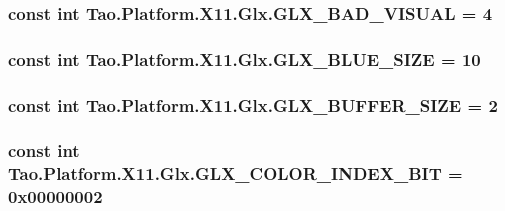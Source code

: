 \label{class_tao_1_1_platform_1_1_x11_1_1_glx_abf751a9967b1a5fb0d1f672a363e21b6}
\hypertarget{class_tao_1_1_platform_1_1_x11_1_1_glx_a884e10d10c755a6a3e17018169cf9117}{
\subsubsection[{GLX\_\-BAD\_\-VISUAL}]{\setlength{\rightskip}{0pt plus 5cm}const int {\bf Tao.Platform.X11.Glx.GLX\_\-BAD\_\-VISUAL} = 4}}
\label{class_tao_1_1_platform_1_1_x11_1_1_glx_a884e10d10c755a6a3e17018169cf9117}
\hypertarget{class_tao_1_1_platform_1_1_x11_1_1_glx_a9dedfd5e84ea2d6e12e45ffb451bf5c4}{
\subsubsection[{GLX\_\-BLUE\_\-SIZE}]{\setlength{\rightskip}{0pt plus 5cm}const int {\bf Tao.Platform.X11.Glx.GLX\_\-BLUE\_\-SIZE} = 10}}
\label{class_tao_1_1_platform_1_1_x11_1_1_glx_a9dedfd5e84ea2d6e12e45ffb451bf5c4}
\hypertarget{class_tao_1_1_platform_1_1_x11_1_1_glx_a1d668eba3b5a2ae6f75cdddbfba5020f}{
\subsubsection[{GLX\_\-BUFFER\_\-SIZE}]{\setlength{\rightskip}{0pt plus 5cm}const int {\bf Tao.Platform.X11.Glx.GLX\_\-BUFFER\_\-SIZE} = 2}}
\label{class_tao_1_1_platform_1_1_x11_1_1_glx_a1d668eba3b5a2ae6f75cdddbfba5020f}
\hypertarget{class_tao_1_1_platform_1_1_x11_1_1_glx_a056beffa48c29bc3c7fa561438a7958d}{
\subsubsection[{GLX\_\-COLOR\_\-INDEX\_\-BIT}]{\setlength{\rightskip}{0pt plus 5cm}const int {\bf Tao.Platform.X11.Glx.GLX\_\-COLOR\_\-INDEX\_\-BIT} = 0x00000002}}
